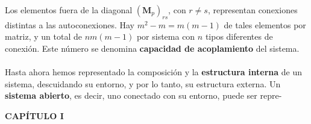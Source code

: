 {Los elementos fuera de la diagonal $(\mathbf{M}_p)_{rs}$, con $r \ne s$, representan conexiones distintas a las autoconexiones. Hay $m^2 - m = m(m - 1)$ de tales elementos por matriz, y un total de $nm(m - 1)$ por sistema con $n$ tipos diferentes de conexión. Este número se denomina \textbf{capacidad de acoplamiento} del sistema.
\\
\\
Hasta ahora hemos representado la composición y la \textbf{estructura interna} de un sistema, descuidando su entorno, y por lo tanto, su estructura externa. Un \textbf{sistema abierto}, es decir, uno conectado con su entorno, puede ser repre-
}
\newpage
\fancyhf{}
\fancyhead[l]{\thepage} 
\begin{center}
{\fontsize{16}{18}\selectfont \textbf{CAPÍTULO I}}
\end{center}
\vspace{0.5cm}

